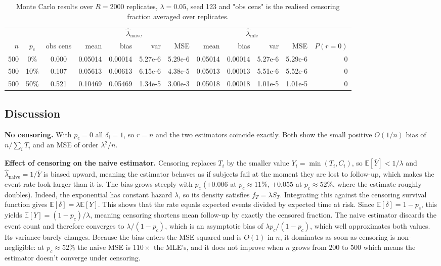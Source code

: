 \documentclass[11pt,a4paper]{article}
\begin{document}
\begin{table}[h!]
\centering
\small
\setlength{\tabcolsep}{4pt}
\caption*{Monte Carlo results over $R=2000$ replicates, $\lambda = 0.05$, seed 123 and
"obs cens" is the realised censoring fraction averaged over replicates.}
\begin{tabular}{@{}rcc rrrr rrrr r@{}}
\toprule
& & & \multicolumn{4}{c}{$\hat{\lambda}_{\text{naive}}$} & \multicolumn{4}{c}{$\hat{\lambda}_{\text{mle}}$} & \\
\cmidrule(lr){4-7}\cmidrule(lr){8-11}
$n$ & $p_c$ & obs cens & mean & bias & var & MSE & mean & bias & var & MSE & $P(r=0)$ \\
\midrule
500 & 0\% & 0.000 & 0.05014 & 0.00014 & 5.27e-6 & 5.29e-6 & 0.05014 & 0.00014 & 5.27e-6 & 5.29e-6 & 0 \\
500 & 10\% & 0.107 & 0.05613 & 0.00613 & 6.15e-6 & 4.38e-5 & 0.05013 & 0.00013 & 5.51e-6 & 5.52e-6 & 0 \\
500 & 50\% & 0.521 & 0.10469 & 0.05469 & 1.34e-5 & 3.00e-3 & 0.05018 & 0.00018 & 1.01e-5 & 1.01e-5 & 0 \\
\bottomrule
\end{tabular}
\end{table}

\subsection*{Discussion}

\textbf{No censoring.} With $p_c = 0$ all $\delta_i = 1$, so $r = n$ and the two estimators coincide
exactly. Both show the small positive $O(1/n)$ bias of $n / \sum_i T_i$ and an MSE of order $\lambda^2/n$.

\textbf{Effect of censoring on the naive estimator.} Censoring replaces $T_i$ by the smaller value
$Y_i = \min(T_i, C_i)$, so $\mathbb{E}[\bar{Y}] < 1/\lambda$ and $\hat{\lambda}_{\text{naive}} = 1/\bar{Y}$
is biased upward, meaning the estimator behaves as if subjects fail at the moment they are lost to
follow-up, which makes the event rate look larger than it is. The bias grows steeply with $p_c$
($+0.006$ at $p_c \approx 11\%$, $+0.055$ at $p_c \approx 52\%$, where the estimate roughly doubles). Indeed, the exponential has constant hazard $\lambda$, so its density satisfies $f_T = \lambda S_T$. Integrating this against the censoring survival function gives $\mathbb{E}[\delta] = \lambda \mathbb{E}[Y]$. This shows that the rate equals expected events divided by expected time at risk. Since $\mathbb{E}[\delta] = 1 - p_c$, this yields $\mathbb{E}[Y] = (1-p_c)/\lambda$, meaning censoring shortens mean follow-up by exactly the censored fraction. The naive estimator discards the event count and therefore converges to $\lambda/(1-p_c)$, which is an asymptotic bias of $\lambda p_c/(1-p_c)$, which well approximates both values. Its variance barely
changes. Because the bias enters the MSE squared and is $O(1)$ in $n$, it dominates as soon as censoring
is non-negligible: at $p_c \approx 52\%$ the naive MSE is $110\times$ the MLE's, and it does
not improve when $n$ grows from $200$ to $500$ which means the estimator doesn't converge under censoring.
\end{document}
